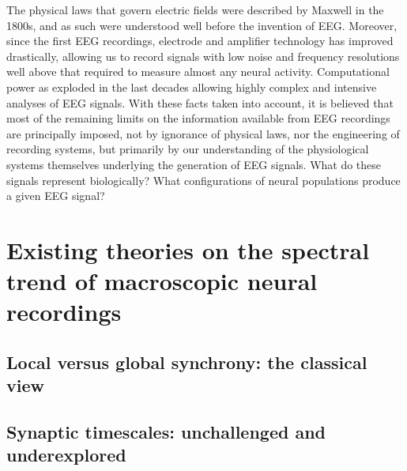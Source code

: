 The physical laws that govern electric fields were described by Maxwell in the 1800s, and as such were understood well before the invention of EEG. Moreover, since the first EEG recordings, electrode and amplifier technology has improved drastically, allowing us to record signals with low noise and frequency resolutions well above that required to measure almost any neural activity. Computational power as exploded in the last decades allowing highly complex and intensive analyses of EEG signals. With these facts taken into account, it is believed that most of the remaining limits on the information available from EEG recordings are principally imposed, not by ignorance of physical laws, nor the engineering of recording systems, but primarily by our understanding of the physiological systems themselves underlying the generation of EEG signals. What do these signals represent biologically? What configurations of neural populations produce a given EEG signal?

\newpage

\section{Existing theories on the spectral trend of macroscopic neural recordings}
\subsection{Local versus global synchrony: the classical view}

\subsection{Synaptic timescales: unchallenged and underexplored}

